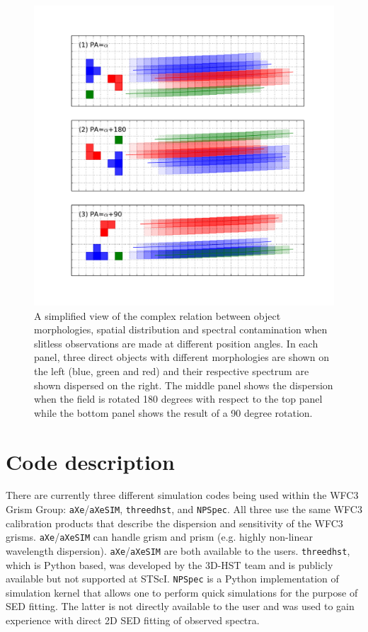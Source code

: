 \documentclass[preprint]{aastex}
\begin{document}
\begin{figure}[!ht]
\centering
\includegraphics[width=5.5in]{"Figures/contam_sim"}
\caption{A simplified view of the complex relation between object morphologies, spatial distribution and spectral contamination when slitless observations are made at different position angles. In each panel, three direct objects with different morphologies are shown on the left (blue, green and red) and their respective spectrum are shown dispersed on the right. The middle panel shows the dispersion when the field is rotated 180 degrees with respect to the top panel while the bottom panel shows the result of a 90 degree rotation.}
\label{fig:2}
\end{figure}



\section{Code description}

There are currently three different simulation codes being used within the WFC3 Grism Group:  \texttt{aXe}/\texttt{aXeSIM}, \texttt{threedhst}, and \texttt{NPSpec}. All three use the same WFC3 calibration products that describe the dispersion and sensitivity of the WFC3 grisms. \texttt{aXe}/\texttt{aXeSIM} can handle grism and prism (e.g. highly non-linear wavelength dispersion). \texttt{aXe}/\texttt{aXeSIM} are both available to the users. \texttt{threedhst}, which is Python based, was developed by the 3D-HST team and is publicly available but not supported at STScI. \texttt{NPSpec} is a Python implementation of simulation kernel that allows one to perform quick simulations for the purpose of SED fitting. The latter is not directly available to the user and was used to gain experience with direct 2D SED fitting of observed spectra.
\end{document}
